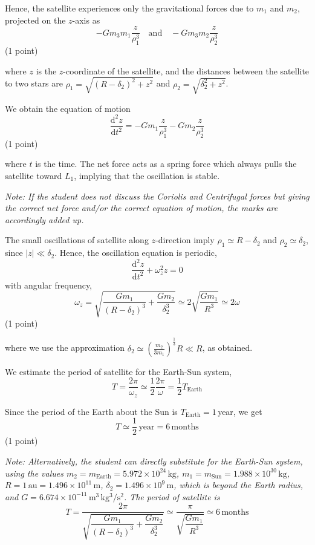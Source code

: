 \begin{description}
  Hence, the satellite experiences only the gravitational forces due to
  $m_1$ and $m_2$, projected on the $z$-axis as
  \[ -Gm_3m_1\frac{z}{\rho_1^3} \quad\text{and}\quad
     -Gm_3m_2\frac{z}{\rho_2^3} \]
  \hfill(1 point)

  where $z$ is the $z$-coordinate of the satellite, and the distances
  between the satellite to two stars are
  $\rho_1 = \sqrt{(R - \delta_2)^2 + z^2}$ and
  $\rho_2 = \sqrt{\delta_2^2 + z^2}$.

  We obtain the equation of motion
  \[ \frac{\mathrm{d}^2 z}{\mathrm{d}t^2}
     = -Gm_1\frac{z}{\rho_1^3} - Gm_2\frac{z}{\rho_2^3} \]
  \hfill(1 point)

  where $t$ is the time. The net force acts as a spring force which always
  pulls the satellite toward $L_1$, implying that the oscillation is stable.

  \emph{Note: If the student does not discuss the Coriolis and Centrifugal
  forces but giving the correct net force and/or the correct equation of
  motion, the marks are accordingly added up.}

\item[(c)] The small oscillations of satellite along $z$-direction imply
  $\rho_1 \simeq R - \delta_2$ and $\rho_2 \simeq \delta_2$, since
  $|z| \ll \delta_2$. Hence, the oscillation equation is periodic,
  \[ \frac{\mathrm{d}^2 z}{\mathrm{d}t^2} + \omega_z^2 z = 0 \]
  with angular frequency,
  \[ \omega_z = \sqrt{\frac{Gm_1}{(R - \delta_2)^3} + \frac{Gm_2}{\delta_2^3}}
     \simeq 2\sqrt{\frac{Gm_1}{R^3}} \simeq 2\omega \]
  \hfill(1 point)

  where we use the approximation
  $\delta_2 \simeq \left(\frac{m_2}{3m_1}\right)^{\frac{1}{3}} R \ll R$,
  as obtained.

  We estimate the period of satellite for the Earth-Sun system,
  \[ T = \frac{2\pi}{\omega_z} \simeq \frac{1}{2}\frac{2\pi}{\omega}
       = \frac{1}{2}T_{\mathrm{Earth}} \]

  Since the period of the Earth about the Sun is
  $T_{\mathrm{Earth}} = 1$\,year, we get
  \[ T \simeq \frac{1}{2}\,\mathrm{year} = 6\,\mathrm{months} \]
  \hfill(1 point)

  \emph{Note: Alternatively, the student can directly substitute for the
  Earth-Sun system, using the values
  $m_2 = m_{\mathrm{Earth}} = 5.972 \times 10^{24}\,\mathrm{kg}$,
  $m_1 = m_{\mathrm{Sun}} = 1.988 \times 10^{30}\,\mathrm{kg}$,
  $R = 1\,\mathrm{au} = 1.496 \times 10^{11}\,\mathrm{m}$,
  $\delta_2 = 1.496 \times 10^9\,\mathrm{m}$, which is beyond the Earth
  radius, and
  $G = 6.674 \times 10^{-11}\,\mathrm{m^3\,kg^3/s^2}$.
  The period of satellite is
  \[ T = \frac{2\pi}{\sqrt{\dfrac{Gm_1}{(R - \delta_2)^3}
                           + \dfrac{Gm_2}{\delta_2^3}}}
       \simeq \frac{\pi}{\sqrt{\dfrac{Gm_1}{R^3}}}
       \simeq 6\,\mathrm{months} \]}
\end{description}

